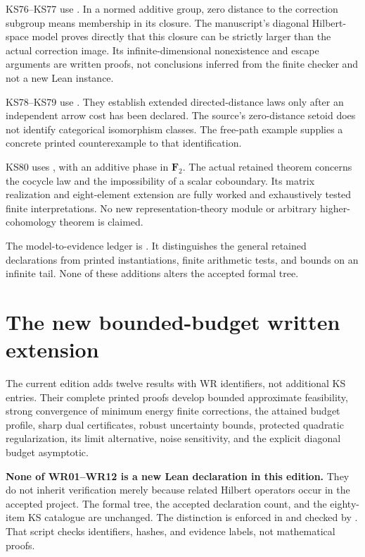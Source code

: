 \documentclass[11pt]{article}
\begin{document}
KS76--KS77 use . In a normed additive group, zero distance to the correction subgroup means membership in its closure. The manuscript's diagonal Hilbert-space model proves directly that this closure can be strictly larger than the actual correction image. Its infinite-dimensional nonexistence and escape arguments are written proofs, not conclusions inferred from the finite checker and not a new Lean instance.

KS78--KS79 use . They establish extended directed-distance laws only after an independent arrow cost has been declared. The source's zero-distance setoid does not identify categorical isomorphism classes. The free-path example supplies a concrete printed counterexample to that identification.

KS80 uses , with an additive phase in \(\mathbf F_2\). The actual retained theorem concerns the cocycle law and the impossibility of a scalar coboundary. Its matrix realization and eight-element extension are fully worked and exhaustively tested finite interpretations. No new representation-theory module or arbitrary higher-cohomology theorem is claimed.

The model-to-evidence ledger is . It distinguishes the general retained declarations from printed instantiations, finite arithmetic tests, and bounds on an infinite tail. None of these additions alters the accepted formal tree.

\section{The new bounded-budget written extension}
The current edition adds twelve results with WR identifiers, not additional KS entries. Their complete printed proofs develop bounded approximate feasibility, strong convergence of minimum energy finite corrections, the attained budget profile, sharp dual certificates, robust uncertainty bounds, protected quadratic regularization, its limit alternative, noise sensitivity, and the explicit diagonal budget asymptotic.

\textbf{None of WR01--WR12 is a new Lean declaration in this edition.} They do not inherit verification merely because related Hilbert operators occur in the accepted project. The formal tree, the accepted declaration count, and the eighty-item KS catalogue are unchanged. The distinction is enforced in  and checked by . That script checks identifiers, hashes, and evidence labels, not mathematical proofs.
\end{document}
